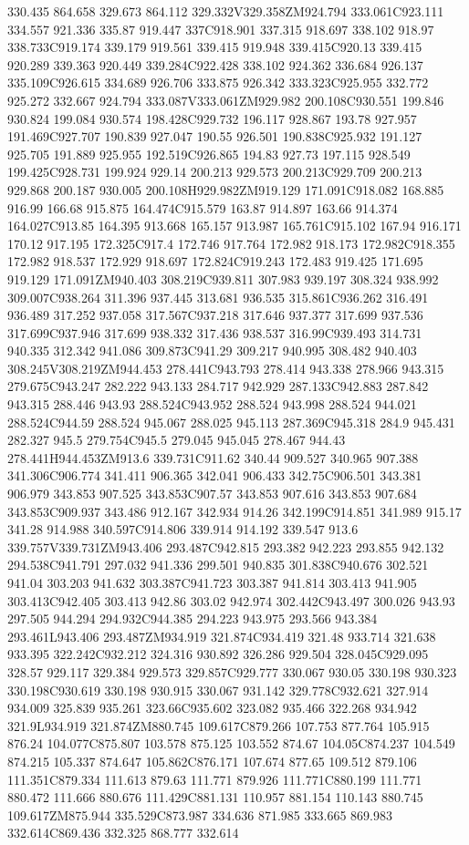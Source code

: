 330.435 864.658 329.673 864.112 329.332V329.358ZM924.794 333.061C923.111 334.557 921.336 335.87 919.447 337C918.901 337.315 918.697 338.102 918.97 338.733C919.174 339.179 919.561 339.415 919.948 339.415C920.13 339.415 920.289 339.363 920.449 339.284C922.428 338.102 924.362 336.684 926.137 335.109C926.615 334.689 926.706 333.875 926.342 333.323C925.955 332.772 925.272 332.667 924.794 333.087V333.061ZM929.982 200.108C930.551 199.846 930.824 199.084 930.574 198.428C929.732 196.117 928.867 193.78 927.957 191.469C927.707 190.839 927.047 190.55 926.501 190.838C925.932 191.127 925.705 191.889 925.955 192.519C926.865 194.83 927.73 197.115 928.549 199.425C928.731 199.924 929.14 200.213 929.573 200.213C929.709 200.213 929.868 200.187 930.005 200.108H929.982ZM919.129 171.091C918.082 168.885 916.99 166.68 915.875 164.474C915.579 163.87 914.897 163.66 914.374 164.027C913.85 164.395 913.668 165.157 913.987 165.761C915.102 167.94 916.171 170.12 917.195 172.325C917.4 172.746 917.764 172.982 918.173 172.982C918.355 172.982 918.537 172.929 918.697 172.824C919.243 172.483 919.425 171.695 919.129 171.091ZM940.403 308.219C939.811 307.983 939.197 308.324 938.992 309.007C938.264 311.396 937.445 313.681 936.535 315.861C936.262 316.491 936.489 317.252 937.058 317.567C937.218 317.646 937.377 317.699 937.536 317.699C937.946 317.699 938.332 317.436 938.537 316.99C939.493 314.731 940.335 312.342 941.086 309.873C941.29 309.217 940.995 308.482 940.403 308.245V308.219ZM944.453 278.441C943.793 278.414 943.338 278.966 943.315 279.675C943.247 282.222 943.133 284.717 942.929 287.133C942.883 287.842 943.315 288.446 943.93 288.524C943.952 288.524 943.998 288.524 944.021 288.524C944.59 288.524 945.067 288.025 945.113 287.369C945.318 284.9 945.431 282.327 945.5 279.754C945.5 279.045 945.045 278.467 944.43 278.441H944.453ZM913.6 339.731C911.62 340.44 909.527 340.965 907.388 341.306C906.774 341.411 906.365 342.041 906.433 342.75C906.501 343.381 906.979 343.853 907.525 343.853C907.57 343.853 907.616 343.853 907.684 343.853C909.937 343.486 912.167 342.934 914.26 342.199C914.851 341.989 915.17 341.28 914.988 340.597C914.806 339.914 914.192 339.547 913.6 339.757V339.731ZM943.406 293.487C942.815 293.382 942.223 293.855 942.132 294.538C941.791 297.032 941.336 299.501 940.835 301.838C940.676 302.521 941.04 303.203 941.632 303.387C941.723 303.387 941.814 303.413 941.905 303.413C942.405 303.413 942.86 303.02 942.974 302.442C943.497 300.026 943.93 297.505 944.294 294.932C944.385 294.223 943.975 293.566 943.384 293.461L943.406 293.487ZM934.919 321.874C934.419 321.48 933.714 321.638 933.395 322.242C932.212 324.316 930.892 326.286 929.504 328.045C929.095 328.57 929.117 329.384 929.573 329.857C929.777 330.067 930.05 330.198 930.323 330.198C930.619 330.198 930.915 330.067 931.142 329.778C932.621 327.914 934.009 325.839 935.261 323.66C935.602 323.082 935.466 322.268 934.942 321.9L934.919 321.874ZM880.745 109.617C879.266 107.753 877.764 105.915 876.24 104.077C875.807 103.578 875.125 103.552 874.67 104.05C874.237 104.549 874.215 105.337 874.647 105.862C876.171 107.674 877.65 109.512 879.106 111.351C879.334 111.613 879.63 111.771 879.926 111.771C880.199 111.771 880.472 111.666 880.676 111.429C881.131 110.957 881.154 110.143 880.745 109.617ZM875.944 335.529C873.987 334.636 871.985 333.665 869.983 332.614C869.436 332.325 868.777 332.614 